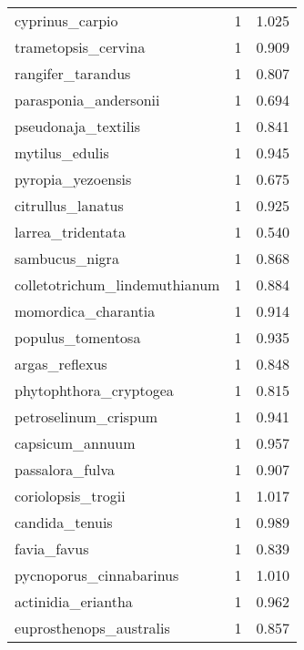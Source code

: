 \begin{tabular}{lrr}
                cyprinus\_carpio &                   1 &     1.025 \\
            trametopsis\_cervina &                   1 &     0.909 \\
              rangifer\_tarandus &                   1 &     0.807 \\
          parasponia\_andersonii &                   1 &     0.694 \\
            pseudonaja\_textilis &                   1 &     0.841 \\
                 mytilus\_edulis &                   1 &     0.945 \\
              pyropia\_yezoensis &                   1 &     0.675 \\
              citrullus\_lanatus &                   1 &     0.925 \\
              larrea\_tridentata &                   1 &     0.540 \\
                 sambucus\_nigra &                   1 &     0.868 \\
  colletotrichum\_lindemuthianum &                   1 &     0.884 \\
            momordica\_charantia &                   1 &     0.914 \\
              populus\_tomentosa &                   1 &     0.935 \\
                 argas\_reflexus &                   1 &     0.848 \\
         phytophthora\_cryptogea &                   1 &     0.815 \\
           petroselinum\_crispum &                   1 &     0.941 \\
                capsicum\_annuum &                   1 &     0.957 \\
                passalora\_fulva &                   1 &     0.907 \\
             coriolopsis\_trogii &                   1 &     1.017 \\
                 candida\_tenuis &                   1 &     0.989 \\
                    favia\_favus &                   1 &     0.839 \\
        pycnoporus\_cinnabarinus &                   1 &     1.010 \\
             actinidia\_eriantha &                   1 &     0.962 \\
        euprosthenops\_australis &                   1 &     0.857 \\

\end{tabular}

